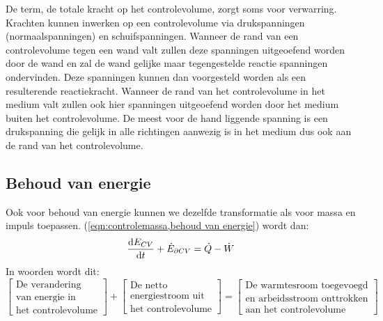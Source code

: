 De term, de totale kracht op het controlevolume, zorgt soms voor verwarring. Krachten kunnen inwerken op een controlevolume via drukspanningen (normaalspanningen) en schuifspanningen. Wanneer de rand van een controlevolume tegen een wand valt zullen deze spanningen uitgeoefend worden door de wand en zal de wand gelijke maar tegengestelde reactie spanningen ondervinden. Deze spanningen kunnen dan voorgesteld worden als een resulterende reactiekracht. Wanneer de rand van het controlevolume in het medium valt zullen ook hier spanningen uitgeoefend worden door het medium buiten het controlevolume. De meest voor de hand liggende spanning is een drukspanning die gelijk in alle richtingen aanwezig is in het medium dus ook aan de rand van het controlevolume.

			\subsection{Behoud van energie}
			\label{sec:Behoud van energie}
Ook voor behoud van energie kunnen we dezelfde transformatie als voor massa en impuls toepassen. (\ref{eqn:controlemassa,behoud van energie}) wordt dan:
\begin{equation}
	\frac{\mathrm{d} E_{CV}}{\mathrm{d} t} + \dot{E}_{\partial CV} =  \dot{Q}-\dot{W}
	\label{eqn:controlevolume,behoud van energie}
\end{equation}
In woorden wordt dit:
\begin{equation}
	\left[
		\begin{array}{c}
			\mbox{De verandering} \\ \mbox{van energie in} \\ \mbox{het controlevolume}
		\end{array}
	\right]
	+
	\left[
		\begin{array}{c}
			\mbox{De netto} \\ \mbox{energiestroom uit} \\ \mbox{het controlevolume}
		\end{array}
	\right]
	=
	\left[
		\begin{array}{c}
			\mbox{De warmtesroom toegevoegd} \\ \mbox{en arbeidsstroom onttrokken} \\ \mbox{aan het controlevolume}
		\end{array}
	\right]
	\label{eqn:controlevolume,behoud van energie,woorden}
\end{equation}


